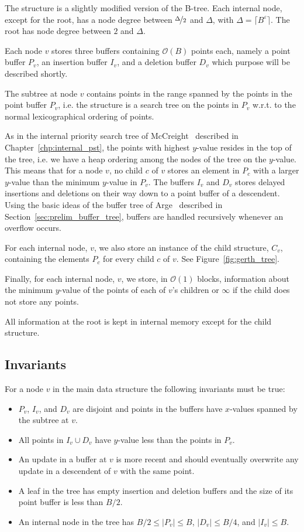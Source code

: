 \documentclass[twoside,11pt,openright]{report}
\def \epsilon {\varepsilon}
\begin{document}
The structure is a slightly modified version of the B-tree. Each internal node, except for the root, has a node degree between $\nicefrac{\Delta}{2}$ and $\Delta$, with $\Delta = \lceil B^\epsilon \rceil$. The root has node degree between $2$ and $\Delta$.

Each node $v$ stores three buffers containing $\mathcal{O}(B)$ points each, namely a point buffer $P_v$, an insertion buffer $I_v$, and a deletion buffer $D_v$ which purpose will be described shortly.

The subtree at node $v$ contains points in the range spanned by the points in the point buffer $P_v$, i.e. the structure is a search tree on the points in $P_v$ w.r.t. to the normal lexicographical ordering of points.

As in the internal priority search tree of McCreight~\cite{DBLP:journals/siamcomp/McCreight85} described in Chapter~\ref{chp:internal_pst}, the points with highest $y$-value resides in the top of the tree, i.e. we have a heap ordering among the nodes of the tree on the $y$-value. This means that for a node $v$, no child $c$ of $v$ stores an element in $P_c$ with a larger $y$-value than the minimum $y$-value in $P_v$.
The buffers $I_v$ and $D_v$ stores delayed insertions and deletions on their way down to a point buffer of a descendent. Using the basic ideas of the buffer tree of Arge~\cite{Arge:1995:BTN:645930.672850} described in Section~\ref{sec:prelim_buffer_tree}, buffers are handled recursively whenever an overflow occurs.

For each internal node, $v$, we also store an instance of the child structure, $C_v$, containing the elements $P_c$ for every child $c$ of $v$. See Figure~\ref{fig:gerth_tree}.

Finally, for each internal node, $v$, we store, in $\mathcal{O}(1)$ blocks, information about the minimum $y$-value of the points of each of $v$'s children or $\infty$ if the child does not store any points.

All information at the root is kept in internal memory except for the child structure.

\subsection{Invariants}
For a node $v$ in the main data structure the following invariants must be true:
\begin{itemize}
	\item $P_v$, $I_v$, and $D_v$ are disjoint and points in the buffers have $x$-values spanned by the subtree at $v$.
	\item All points in $I_v \cup D_v$ have $y$-value less than the points in $P_v$.
	\item An update in a buffer at $v$ is more recent and should eventually overwrite any update in a descendent of $v$ with the same point.
	\item A leaf in the tree has empty insertion and deletion buffers and the size of its point buffer is less than $B/2$.
	\item An internal node in the tree has $B/2 \leq \vert P_v \vert \leq B$, $\vert D_v \vert \leq B/4$, and $\vert I_v \vert \leq B$.
\end{itemize}
\end{document}
